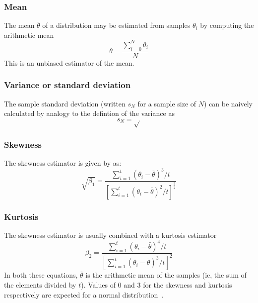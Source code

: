 \subsubsection{Mean}
The mean $\bar{\theta}$ of a distribution may be estimated from samples $\theta_i$ by computing the arithmetic mean
\begin{equation}
  \label{eq:mean}
  \bar{\theta} = \frac{\displaystyle \sum_{i=0}^N \theta_i}{N}
\end{equation}
This is an unbiased estimator of the mean.

\subsubsection{Variance or standard deviation}
The sample standard deviation (written $s_N$ for a sample size of $N$) can be naively calculated by analogy to the defintion of the variance as
\begin{equation}
  \label{eq:samplestandardeviation}
  s_N = \sqrt{}
\end{equation}

\subsubsection{Skewness}
The skewness estimator is given by \citet{mooney1997monte} as:
\begin{equation} 
  \sqrt{\beta_1} =
  \frac{\displaystyle\sum_{i=1}^t \left ( \theta_i - \bar{\theta} \right
    )^3/t} { \left [ \displaystyle\sum_{i=1}^t \left (
        \theta_i-\bar{\theta} \right )^2/t \right ]^\frac{3}{2}} 
\end{equation}

\subsubsection{Kurtosis}
The skewness estimator is usually combined with a kurtosis estimator 
\begin{equation} 
  \beta_2 =
  \frac{\displaystyle\sum_{i=1}^t \left ( \theta_i - \bar{\theta} \right
    )^4/t} { \left [ \displaystyle\sum_{i=1}^t \left(
        \theta_i-\bar{\theta} \right)^3/t \right]^2} 
\end{equation}
%
In both these equations, $\bar{\theta}$ is the arithmetic mean of the samples (ie, the sum of the elements divided by $t$).  
Values of 0 and 3 for the skewness and kurtosis respectively are expected for a normal distribution~\citep{kleijnen1975statistical}.

